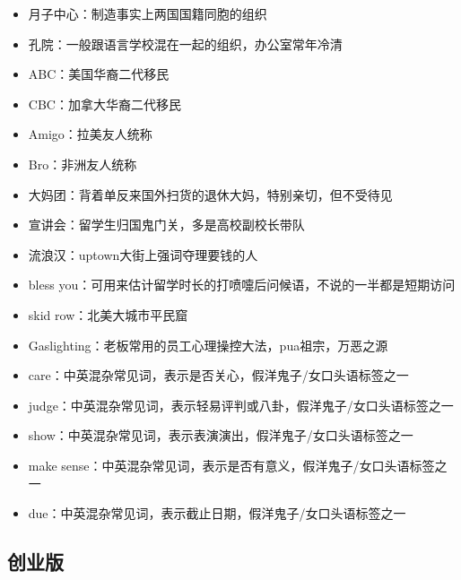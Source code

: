\documentclass[]{tufte-book}
\begin{document}
\begin{itemize}
\item
  月子中心：制造事实上两国国籍同胞的组织
\item
  孔院：一般跟语言学校混在一起的组织，办公室常年冷清
\item
  ABC：美国华裔二代移民
\item
  CBC：加拿大华裔二代移民
\item
  Amigo：拉美友人统称
\item
  Bro：非洲友人统称
\item
  大妈团：背着单反来国外扫货的退休大妈，特别亲切，但不受待见
\item
  宣讲会：留学生归国鬼门关，多是高校副校长带队
\item
  流浪汉：uptown大街上强词夺理要钱的人
\item
  bless you：可用来估计留学时长的打喷嚏后问候语，不说的一半都是短期访问
\item
  skid row：北美大城市平民窟
\item
  Gaslighting：老板常用的员工心理操控大法，pua祖宗，万恶之源
\item
  care：中英混杂常见词，表示是否关心，假洋鬼子/女口头语标签之一
\item
  judge：中英混杂常见词，表示轻易评判或八卦，假洋鬼子/女口头语标签之一
\item
  show：中英混杂常见词，表示表演演出，假洋鬼子/女口头语标签之一
\item
  make sense：中英混杂常见词，表示是否有意义，假洋鬼子/女口头语标签之一
\item
  due：中英混杂常见词，表示截止日期，假洋鬼子/女口头语标签之一
\end{itemize}

\hypertarget{ux521bux4e1aux7248}{%
\subsection*{创业版}\label{ux521bux4e1aux7248}}
\end{document}
